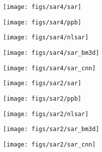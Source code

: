 \documentclass{article}
\begin{document}
\begin{figure*}[t]
	\begin{minipage}[b]{0.19\linewidth}
		\centerline{\texttt{[image: figs/sar4/sar]}}
	\end{minipage}
	\hfill
	\begin{minipage}[b]{0.19\linewidth}
		\centerline{\texttt{[image: figs/sar4/ppb]}}
	\end{minipage}
	\hfill
	\begin{minipage}[b]{0.19\linewidth}
		\centerline{\texttt{[image: figs/sar4/nlsar]}}
	\end{minipage}
	\hfill
	\begin{minipage}[b]{0.19\linewidth}
		\centerline{\texttt{[image: figs/sar4/sar\_bm3d]}}
	\end{minipage}
	\hfill
	\begin{minipage}[b]{0.19\linewidth}
		\centerline{\texttt{[image: figs/sar4/sar\_cnn]}}
	\end{minipage}
	
	\vspace{1mm} \noindent
	\begin{minipage}[b]{0.19\linewidth}
		\centerline{\texttt{[image: figs/sar2/sar]}}
	\end{minipage}
	\hfill
	\begin{minipage}[b]{0.19\linewidth}
		\centerline{\texttt{[image: figs/sar2/ppb]}}
	\end{minipage}
	\hfill
	\begin{minipage}[b]{0.19\linewidth}
		\centering
		\centerline{\texttt{[image: figs/sar2/nlsar]}}
	\end{minipage}
	\hfill
	\begin{minipage}[b]{0.19\linewidth}
		\centering
		\centerline{\texttt{[image: figs/sar2/sar\_bm3d]}}
	\end{minipage}
	\hfill
	\begin{minipage}[b]{0.19\linewidth}
		\centering
		\centerline{\texttt{[image: figs/sar2/sar\_cnn]}}
	\end{minipage}
	

\end{figure*}
\end{document}
